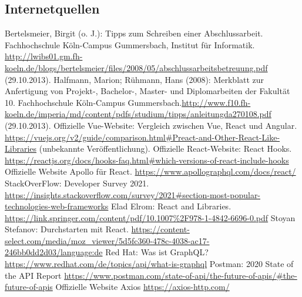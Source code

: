      \subsection{Internetquellen}
     \begin{thebibliography}{2} %
       Bertelsmeier, Birgit (o. J.): Tipps zum Schrei\-b\-en ei\-n\-er Ab\-sch\-luss\-ar\-beit. Fach\-hoch\-schu\-le Köln-Campus Gummersbach, Institut für Informatik. \url{http://lwibs01.gm.fh-koeln.de/blogs/bertelsmeier/files/2008/05/abschlussarbeitsbetreuung.pdf} (29.10.2013).
         Halfmann, Marion; Rühmann, Hans (2008): Merkblatt zur Anfertigung von Projekt-, Bachelor-, Master- und Diplomarbeiten der Fakultät 10. Fachhochschule Köln-Campus Gummersbach.\url{http://www.f10.fh-koeln.de/imperia/md/content/pdfs/studium/tipps/anleitungda270108.pdf} (29.10.2013).
         Offizielle Vue-Website: Vergleich zwischen Vue, React und Angular. \url{https://vuejs.org/v2/guide/comparison.html#Preact-and-Other-React-Like-Libraries} (unbekannte Veröffentlichung).
        Offizielle React-Website: React Hooks. \url{https://reactjs.org/docs/hooks-faq.html#which-versions-of-react-include-hooks}
        Offizielle Website Apollo für React. \url{https://www.apollographql.com/docs/react/}
        StackOverFlow: Developer Survey 2021. \url{https://insights.stackoverflow.com/survey/2021#section-most-popular-technologies-web-frameworks}
        Elad Elrom: React and Libraries. \url{https://link.springer.com/content/pdf/10.1007%2F978-1-4842-6696-0.pdf}
        Stoyan Stefanov: Durchstarten mit React. \url{https://content-select.com/media/moz_viewer/5d5fc360-478c-4038-ac17-246bb0dd2d03/language:de}
        Red Hat: Was ist GraphQL? \url{https://www.redhat.com/de/topics/api/what-is-graphql}
        Postman: 2020 State of the API Report \url{https://www.postman.com/state-of-api/the-future-of-apis/#the-future-of-apis}
        Offizielle Website Axios \url{https://axios-http.com/}


\end{thebibliography}

